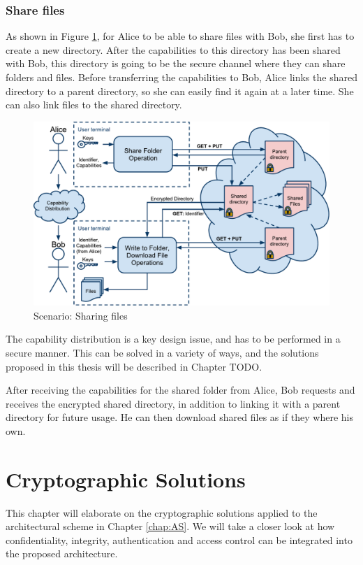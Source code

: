 \documentclass[english,12pt,a4paper]{book}
\begin{document}
\subsection{Share files}

As shown in Figure \ref{fig:AS:sharing}, for Alice to be able to share files
with Bob, she first has to create a new directory. After the capabilities to
this directory has been shared with Bob, this directory is going to be the
secure channel where they can share folders and files. Before transferring the
capabilities to Bob, Alice links the shared directory to a parent directory, so
she can easily find it again at a later time. She can also link files to the
shared directory.

\begin{figure}[h!]
    \centering
    \includegraphics[width=\columnwidth]{ArchitectureShare.pdf}
    \caption{Scenario: Sharing files}
    \label{fig:AS:sharing}
\end{figure}

The capability distribution is a key design issue, and has to be performed in a
secure manner. This can be solved in a variety of ways, and the solutions
proposed in this thesis will be described in Chapter TODO.

After receiving the capabilities for the shared folder from Alice, Bob requests
and receives the encrypted shared directory, in addition to linking it with a
parent directory for future usage. He can then download shared files as if they
where his own.

\chapter{Cryptographic Solutions}
\label{chap:CS}
This chapter will elaborate on the cryptographic solutions applied to the
architectural scheme in Chapter \ref{chap:AS}. We will take a closer look at
how confidentiality, integrity, authentication and access control can be 
integrated into the proposed architecture.
\end{document}
